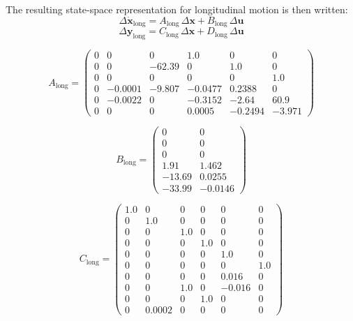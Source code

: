 \documentclass[lettersize,journal]{IEEEtran}
\begin{document}
The resulting state-space representation for longitudinal motion is then written:
\begin{equation}
\Delta \bm{\dot{x}_{\mathrm{long}}} = A_{\mathrm{long}}\,\Delta\bm{x} + B_{\mathrm{long}}\,\Delta\bm{u}
\end{equation}
\begin{equation}
\Delta\bm{y_{\mathrm{long}}} = C_{\mathrm{long}}\,\Delta\bm{x} + D_{\mathrm{long}}\,\Delta\bm{u}
\end{equation}

\footnotesize
\begin{equation}
A_{\mathrm{long}}=\left(\begin{array}{cccccc} 0 & 0 & 0 & 1.0 & 0 & 0\\ 0 & 0 & -62.39 & 0 & 1.0 & 0\\ 0 & 0 & 0 & 0 & 0 & 1.0\\ 0 & -0.0001 & -9.807 & -0.0477 & 0.2388 & 0\\ 0 & -0.0022 & 0 & -0.3152 & -2.64 & 60.9\\ 0 & 0 & 0 & 0.0005 & -0.2494 & -3.971 \end{array}\right)
\end{equation}

\normalsize
\begin{equation}
B_{\mathrm{long}}=\left(\begin{array}{cc} 0 & 0\\ 0 & 0\\ 0 & 0\\ 1.91 & 1.462\\ -13.69 & 0.0255\\ -33.99 & -0.0146 \end{array}\right)
\end{equation}

\footnotesize
\begin{equation}
C_{\mathrm{long}}=\left(\begin{array}{cccccc} 1.0 & 0 & 0 & 0 & 0 & 0\\ 0 & 1.0 & 0 & 0 & 0 & 0\\ 0 & 0 & 1.0 & 0 & 0 & 0\\ 0 & 0 & 0 & 1.0 & 0 & 0\\ 0 & 0 & 0 & 0 & 1.0 & 0\\ 0 & 0 & 0 & 0 & 0 & 1.0\\ 0 & 0 & 0 & 0 & 0.016 & 0\\ 0 & 0 & 1.0 & 0 & -0.016 & 0\\ 0 & 0 & 0 & 1.0 & 0 & 0\\ 0 & 0.0002 & 0 & 0 & 0 & 0 \end{array}\right)
\end{equation}
\end{document}
